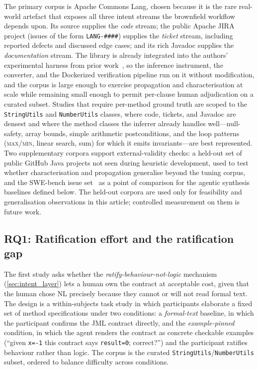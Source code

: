 The primary corpus is Apache Commons Lang, chosen because it is the rare real-world artefact that exposes all three intent streams the brownfield workflow depends upon. Its source supplies the \emph{code} stream; the public Apache JIRA project (issues of the form \texttt{LANG-\#\#\#\#}) supplies the \emph{ticket} stream, including reported defects and discussed edge cases; and its rich Javadoc supplies the \emph{documentation} stream. The library is already integrated into the authors' experimental harness from prior work~\cite{edmonds_article3,edmonds_article4}, so the inference instrument, the converter, and the Dockerized verification pipeline run on it without modification, and the corpus is large enough to exercise propagation and characterisation at scale while remaining small enough to permit per-clause human adjudication on a curated subset. Studies that require per-method ground truth are scoped to the \texttt{StringUtils} and \texttt{NumberUtils} classes, where code, tickets, and Javadoc are densest and where the method classes the inferrer already handles well---null-safety, array bounds, simple arithmetic postconditions, and the loop patterns (\textsc{max}/\textsc{min}, linear search, sum) for which it emits invariants---are best represented. Two supplementary corpora support external-validity checks: a held-out set of public GitHub Java projects not seen during heuristic development, used to test whether characterisation and propagation generalise beyond the tuning corpus, and the SWE-bench issue set~\cite{jimenez2024swebench} as a point of comparison for the agentic synthesis baselines defined below. The held-out corpora are used only for feasibility and generalisation observations in this article; controlled measurement on them is future work.

\subsection{RQ1: Ratification effort and the ratification gap}\label{subsec:eval_rq1}

The first study asks whether the \emph{ratify-behaviour-not-logic} mechanism (\cref{sec:intent_layer}) lets a human own the contract at acceptable cost, given that the human chose NL precisely because they cannot or will not read formal text. The design is a within-subjects task study in which participants elaborate a fixed set of method specifications under two conditions: a \emph{formal-text} baseline, in which the participant confirms the JML contract directly, and the \emph{example-pinned} condition, in which the agent renders the contract as concrete checkable examples (``given \verb|x=-1| this contract says \verb|result=0|; correct?'') and the participant ratifies behaviour rather than logic. The corpus is the curated \texttt{StringUtils}/\texttt{NumberUtils} subset, ordered to balance difficulty across conditions.

